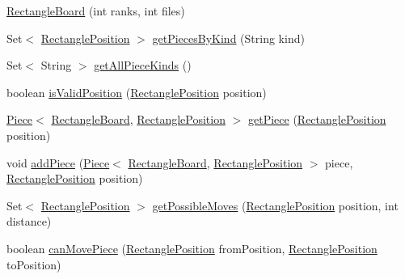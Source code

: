 \begin{DoxyCompactItemize}
\item 
\hyperlink{classedu_1_1xwei12_1_1chess_1_1_rectangle_board_a6406a4cfbabca7c41bcdcd9165764df0}{Rectangle\+Board} (int ranks, int files)
\item 
Set$<$ \hyperlink{classedu_1_1xwei12_1_1chess_1_1_rectangle_position}{Rectangle\+Position} $>$ \hyperlink{classedu_1_1xwei12_1_1chess_1_1_rectangle_board_a74cb08b9090a40990661e9283438d937}{get\+Pieces\+By\+Kind} (String kind)
\item 
Set$<$ String $>$ \hyperlink{classedu_1_1xwei12_1_1chess_1_1_rectangle_board_ab89613a1fa0c7178a6108a1ec7c3962b}{get\+All\+Piece\+Kinds} ()
\item 
boolean \hyperlink{classedu_1_1xwei12_1_1chess_1_1_rectangle_board_afd744749597e097cac2f9ab7abe7064d}{is\+Valid\+Position} (\hyperlink{classedu_1_1xwei12_1_1chess_1_1_rectangle_position}{Rectangle\+Position} position)
\item 
\hyperlink{classedu_1_1xwei12_1_1chess_1_1_piece}{Piece}$<$ \hyperlink{classedu_1_1xwei12_1_1chess_1_1_rectangle_board}{Rectangle\+Board}, \hyperlink{classedu_1_1xwei12_1_1chess_1_1_rectangle_position}{Rectangle\+Position} $>$ \hyperlink{classedu_1_1xwei12_1_1chess_1_1_rectangle_board_a4992efb221dfa1811e6b053ec91e3407}{get\+Piece} (\hyperlink{classedu_1_1xwei12_1_1chess_1_1_rectangle_position}{Rectangle\+Position} position)
\item 
void \hyperlink{classedu_1_1xwei12_1_1chess_1_1_rectangle_board_a629a12594a3edc1a33d88e4955591e48}{add\+Piece} (\hyperlink{classedu_1_1xwei12_1_1chess_1_1_piece}{Piece}$<$ \hyperlink{classedu_1_1xwei12_1_1chess_1_1_rectangle_board}{Rectangle\+Board}, \hyperlink{classedu_1_1xwei12_1_1chess_1_1_rectangle_position}{Rectangle\+Position} $>$ piece, \hyperlink{classedu_1_1xwei12_1_1chess_1_1_rectangle_position}{Rectangle\+Position} position)
\item 
Set$<$ \hyperlink{classedu_1_1xwei12_1_1chess_1_1_rectangle_position}{Rectangle\+Position} $>$ \hyperlink{classedu_1_1xwei12_1_1chess_1_1_rectangle_board_aebbe5e735c0759383c8407d964e1293e}{get\+Possible\+Moves} (\hyperlink{classedu_1_1xwei12_1_1chess_1_1_rectangle_position}{Rectangle\+Position} position, int distance)
\item 
boolean \hyperlink{classedu_1_1xwei12_1_1chess_1_1_rectangle_board_a65d288f3b314eb4efd80a85c95a556cd}{can\+Move\+Piece} (\hyperlink{classedu_1_1xwei12_1_1chess_1_1_rectangle_position}{Rectangle\+Position} from\+Position, \hyperlink{classedu_1_1xwei12_1_1chess_1_1_rectangle_position}{Rectangle\+Position} to\+Position)

\end{DoxyCompactItemize}
